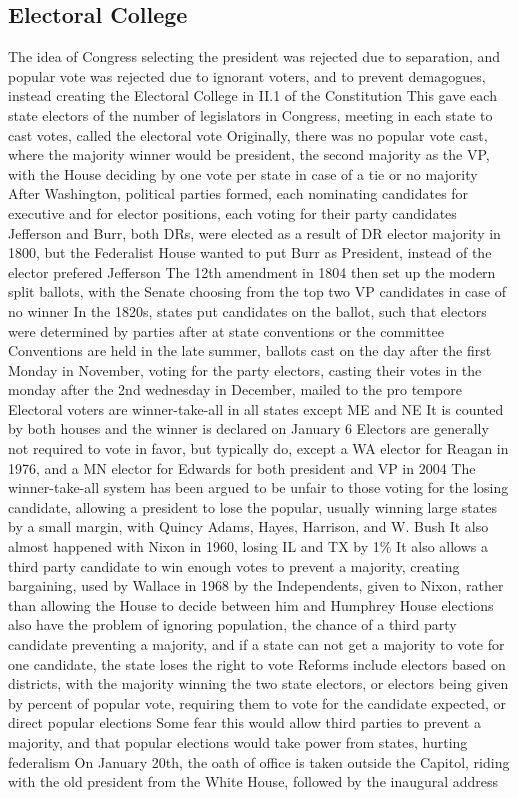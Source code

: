 \documentclass[11 pt, twoside]{article}
\newenvironment{outline*}
{
	\begin{outline}[enumerate]
	}
	{\end{outline}
}
\begin{document}
\subsection{Electoral College}
\begin{outline*}
\1 The idea of Congress selecting the president was rejected due to separation, and popular vote was rejected due to ignorant voters, and to prevent demagogues, instead creating the Electoral College in II.1 of the Constitution
\2 This gave each state electors of the number of legislators in Congress, meeting in each state to cast votes, called the electoral vote
\2 Originally, there was no popular vote cast, where the majority winner would be president, the second majority as the VP, with the House deciding by one vote per state in case of a tie or no majority
\1 After Washington, political parties formed, each nominating candidates for executive and for elector positions, each voting for their party candidates
\2 Jefferson and Burr, both DRs, were elected as a result of DR elector majority in 1800, but the Federalist House wanted to put Burr as President, instead of the elector prefered Jefferson
\2 The 12th amendment in 1804 then set up the modern split ballots, with the Senate choosing from the top two VP candidates in case of no winner
\2 In the 1820s, states put candidates on the ballot, such that electors were determined by parties after at state conventions or the committee
\1 Conventions are held in the late summer, ballots cast on the day after the first Monday in November, voting for the party electors, casting their votes in the monday after the 2nd wednesday in December, mailed to the pro tempore
\2 Electoral voters are winner-take-all in all states except ME and NE
\2 It is counted by both houses and the winner is declared on January 6
\2 Electors are generally not required to vote in favor, but typically do, except a WA elector for Reagan in 1976, and a MN elector for Edwards for both president and VP in 2004
\1 The winner-take-all system has been argued to be unfair to those voting for the losing candidate, allowing a president to lose the popular, usually winning large states by a small margin, with Quincy Adams, Hayes, Harrison, and W. Bush
\2 It also almost happened with Nixon in 1960, losing IL and TX by 1\%
\1 It also allows a third party candidate to win enough votes to prevent a majority, creating bargaining, used by Wallace in 1968 by the Independents, given to Nixon, rather than allowing the House to decide between him and Humphrey
\2 House elections also have the problem of ignoring population, the chance of a third party candidate preventing a majority, and if a state can not get a majority to vote for one candidate, the state loses the right to vote
\1 Reforms include electors based on districts, with the majority winning the two state electors, or electors being given by percent of popular vote, requiring them to vote for the candidate expected, or direct popular elections
\2 Some fear this would allow third parties to prevent a majority, and that popular elections would take power from states, hurting federalism
\1 On January 20th, the oath of office is taken outside the Capitol, riding with the old president from the White House, followed by the inaugural address
\end{outline*}
\end{document}
